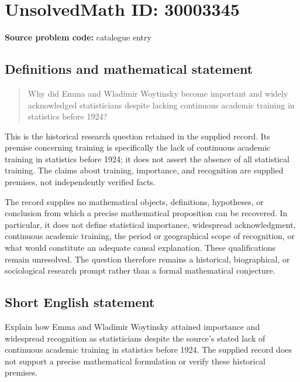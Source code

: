\documentclass[11pt]{article}
\begin{document}
\section*{UnsolvedMath ID: 30003345}
\textbf{Source problem code:} catalogue entry
\subsection{Definitions and mathematical statement}
\begin{quote}
Why did Emma and Wladimir Woytinsky become important and widely acknowledged statisticians despite lacking continuous academic training in statistics before 1924?
\end{quote}
This is the historical research question retained in the supplied record. Its premise concerning training is specifically the lack of continuous academic training in statistics before 1924; it does not assert the absence of all statistical training. The claims about training, importance, and recognition are supplied premises, not independently verified facts.

The record supplies no mathematical objects, definitions, hypotheses, or conclusion from which a precise mathematical proposition can be recovered. In particular, it does not define statistical importance, widespread acknowledgment, continuous academic training, the period or geographical scope of recognition, or what would constitute an adequate causal explanation. These qualifications remain unresolved. The question therefore remains a historical, biographical, or sociological research prompt rather than a formal mathematical conjecture.
\subsection{Short English statement}
Explain how Emma and Wladimir Woytinsky attained importance and widespread recognition as statisticians despite the source's stated lack of continuous academic training in statistics before 1924. The supplied record does not support a precise mathematical formulation or verify these historical premises.
\end{document}
